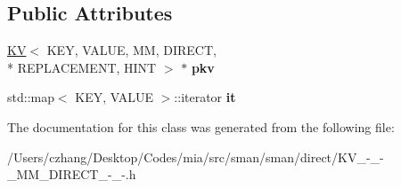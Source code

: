 \subsection*{Public Attributes}
\begin{DoxyCompactItemize}
\item 
\hypertarget{classmia_1_1sm_1_1_k_v_3_01_k_e_y_00_01_v_a_l_u_e_00_01_m_m_00_01_d_i_r_e_c_t_00_01_r_e_p_l_a_c_6d8fd61b5ec60406ef5a5d4939c75a12_af5d9f0b712eeeba5248b10e8f7d28093}{\hyperlink{classmia_1_1sm_1_1_k_v}{K\-V}$<$ K\-E\-Y, V\-A\-L\-U\-E, M\-M, D\-I\-R\-E\-C\-T, \\*
R\-E\-P\-L\-A\-C\-E\-M\-E\-N\-T, H\-I\-N\-T $>$ $\ast$ {\bfseries pkv}}\label{classmia_1_1sm_1_1_k_v_3_01_k_e_y_00_01_v_a_l_u_e_00_01_m_m_00_01_d_i_r_e_c_t_00_01_r_e_p_l_a_c_6d8fd61b5ec60406ef5a5d4939c75a12_af5d9f0b712eeeba5248b10e8f7d28093}

\item 
\hypertarget{classmia_1_1sm_1_1_k_v_3_01_k_e_y_00_01_v_a_l_u_e_00_01_m_m_00_01_d_i_r_e_c_t_00_01_r_e_p_l_a_c_6d8fd61b5ec60406ef5a5d4939c75a12_a3157225041c784118219ae14445bfef3}{std\-::map$<$ K\-E\-Y, V\-A\-L\-U\-E $>$\-::iterator {\bfseries it}}\label{classmia_1_1sm_1_1_k_v_3_01_k_e_y_00_01_v_a_l_u_e_00_01_m_m_00_01_d_i_r_e_c_t_00_01_r_e_p_l_a_c_6d8fd61b5ec60406ef5a5d4939c75a12_a3157225041c784118219ae14445bfef3}

\end{DoxyCompactItemize}


The documentation for this class was generated from the following file\-:\begin{DoxyCompactItemize}
\item 
/\-Users/czhang/\-Desktop/\-Codes/mia/src/sman/sman/direct/K\-V\-\_\--\/\-\_\--\/\-\_\-\-M\-M\-\_\-\-D\-I\-R\-E\-C\-T\-\_\--\/\-\_\--\/.\-h\end{DoxyCompactItemize}
